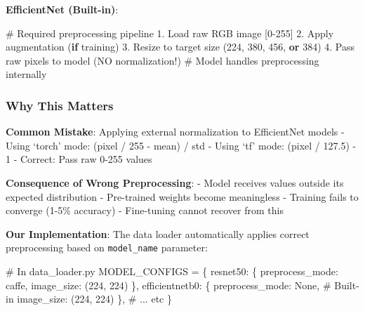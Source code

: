 \documentclass[
  letterpaper,
  DIV=11,
  numbers=noendperiod]{scrartcl}
\newenvironment{Shaded}{\begin{snugshade}}{\end{snugshade}}
\newcommand{\CommentTok}[1]{\textcolor[rgb]{0.37,0.37,0.37}{#1}}
\newcommand{\ControlFlowTok}[1]{\textcolor[rgb]{0.00,0.23,0.31}{\textbf{#1}}}
\newcommand{\DecValTok}[1]{\textcolor[rgb]{0.68,0.00,0.00}{#1}}
\newcommand{\FloatTok}[1]{\textcolor[rgb]{0.68,0.00,0.00}{#1}}
\newcommand{\KeywordTok}[1]{\textcolor[rgb]{0.00,0.23,0.31}{\textbf{#1}}}
\newcommand{\NormalTok}[1]{\textcolor[rgb]{0.00,0.23,0.31}{#1}}
\newcommand{\OperatorTok}[1]{\textcolor[rgb]{0.37,0.37,0.37}{#1}}
\newcommand{\StringTok}[1]{\textcolor[rgb]{0.13,0.47,0.30}{#1}}
\newcommand{\VariableTok}[1]{\textcolor[rgb]{0.07,0.07,0.07}{#1}}
\renewenvironment{Shaded}{%
  \begin{tcolorbox}[%
    enhanced,%
    colback=codebg,%
    colframe=codebg,%
    borderline west={3pt}{0pt}{sectionblue},%
    boxrule=0pt,%
    arc=0pt,%
    boxsep=5pt,%
    left=2mm,%
    right=2mm,%
    top=2mm,%
    bottom=2mm%
  ]%
}{%
  \end{tcolorbox}%
}
\begin{document}
\textbf{EfficientNet (Built-in)}:

\begin{Shaded}
\begin{Highlighting}[]
\CommentTok{\# Required preprocessing pipeline}
\FloatTok{1.}\NormalTok{ Load raw RGB image [}\DecValTok{0}\OperatorTok{{-}}\DecValTok{255}\NormalTok{]}
\FloatTok{2.}\NormalTok{ Apply augmentation (}\ControlFlowTok{if}\NormalTok{ training)}
\FloatTok{3.}\NormalTok{ Resize to target size (}\DecValTok{224}\NormalTok{, }\DecValTok{380}\NormalTok{, }\DecValTok{456}\NormalTok{, }\KeywordTok{or} \DecValTok{384}\NormalTok{)}
\FloatTok{4.}\NormalTok{ Pass raw pixels to model (NO normalization}\OperatorTok{!}\NormalTok{)}
\CommentTok{\# Model handles preprocessing internally}
\end{Highlighting}
\end{Shaded}

\subsubsection{Why This Matters}\label{why-this-matters}

\textbf{Common Mistake}: Applying external normalization to EfficientNet
models - Using `torch' mode: (pixel / 255 - mean) / std - Using `tf'
mode: (pixel / 127.5) - 1 - Correct: Pass raw 0-255 values

\textbf{Consequence of Wrong Preprocessing}: - Model receives values
outside its expected distribution - Pre-trained weights become
meaningless - Training fails to converge (1-5\% accuracy) - Fine-tuning
cannot recover from this

\textbf{Our Implementation}: The data loader automatically applies
correct preprocessing based on \texttt{model\_name} parameter:

\begin{Shaded}
\begin{Highlighting}[]
\CommentTok{\# In data\_loader.py}
\NormalTok{MODEL\_CONFIGS }\OperatorTok{=}\NormalTok{ \{}
    \StringTok{\textquotesingle{}resnet50\textquotesingle{}}\NormalTok{: \{}
        \StringTok{\textquotesingle{}preprocess\_mode\textquotesingle{}}\NormalTok{: }\StringTok{\textquotesingle{}caffe\textquotesingle{}}\NormalTok{,}
        \StringTok{\textquotesingle{}image\_size\textquotesingle{}}\NormalTok{: (}\DecValTok{224}\NormalTok{, }\DecValTok{224}\NormalTok{)}
\NormalTok{    \},}
    \StringTok{\textquotesingle{}efficientnetb0\textquotesingle{}}\NormalTok{: \{}
        \StringTok{\textquotesingle{}preprocess\_mode\textquotesingle{}}\NormalTok{: }\VariableTok{None}\NormalTok{,  }\CommentTok{\# Built{-}in}
        \StringTok{\textquotesingle{}image\_size\textquotesingle{}}\NormalTok{: (}\DecValTok{224}\NormalTok{, }\DecValTok{224}\NormalTok{)}
\NormalTok{    \},}
    \CommentTok{\# ... etc}
\NormalTok{\}}
\end{Highlighting}
\end{Shaded}
\end{document}

